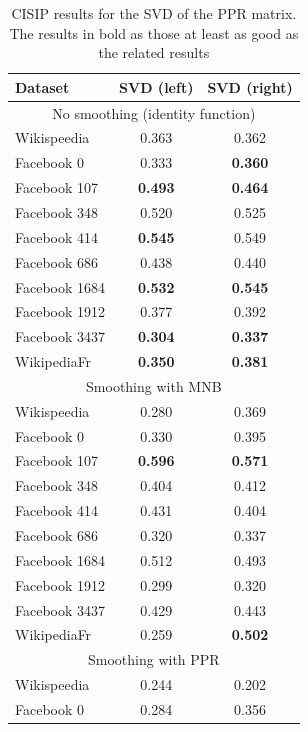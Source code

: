 \begin{table}[t]
\caption[CISIP results for the SVD of the PPR matrix]{CISIP results for the SVD of the PPR matrix. The results in bold as those at least as good as the related \parfaite{} results}
\begin{center}
\begin{tabular}{l|c|c}
\hline
\textbf{Dataset} & \textbf{SVD (left)} & \textbf{SVD (right)}\\
\hline
\multicolumn{3}{c}{No smoothing (identity function)}\\
\hline
Wikispeedia  & 0.363 & 0.362\\
Facebook 0 & 0.333 & \textbf{0.360}\\
Facebook 107 & \textbf{0.493} & \textbf{0.464}\\
Facebook 348 & 0.520 & 0.525\\
Facebook 414 & \textbf{0.545} & 0.549\\
Facebook 686 & 0.438 & 0.440\\
Facebook 1684 & \textbf{0.532} & \textbf{0.545}\\
Facebook 1912 & 0.377 & 0.392\\
Facebook 3437 & \textbf{0.304} & \textbf{0.337}\\
WikipediaFr  & \textbf{0.350} & \textbf{0.381}\\
\hline
\multicolumn{3}{c}{Smoothing with MNB}\\
\hline
Wikispeedia  & 0.280 & 0.369\\
Facebook 0 & 0.330 & 0.395\\
Facebook 107 & \textbf{0.596} & \textbf{0.571}\\
Facebook 348 & 0.404 & 0.412\\
Facebook 414 & 0.431 & 0.404\\
Facebook 686 & 0.320 & 0.337\\
Facebook 1684 & 0.512 & 0.493\\
Facebook 1912 & 0.299 & 0.320\\
Facebook 3437 & 0.429 & 0.443\\
WikipediaFr  & 0.259 & \textbf{0.502}\\
\hline
\multicolumn{3}{c}{Smoothing with PPR}\\
\hline
Wikispeedia  & 0.244 & 0.202\\
Facebook 0 & 0.284 & 0.356\\

\end{tabular}
\end{center}
\end{table}

